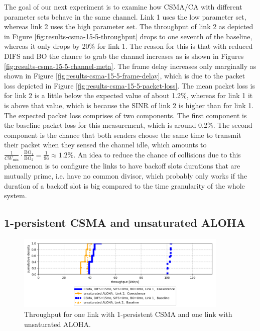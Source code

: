 The goal of our next experiment is to examine how CSMA/CA with different parameter sets behave in the same channel. Link 1 uses the low parameter set, whereas link 2 uses the high parameter set. The throughput of link 2 as depicted in Figure \ref{fig:results-csma-15-5-throughput} drops to one seventh of the baseline, whereas it only drops by 20\% for link 1. The reason for this is that with reduced DIFS and BO the chance to grab the channel increases as is shown in Figures \ref{fig:results-csma-15-5-channel-meta}. The frame delay increases only marginally as shown in Figure \ref{fig:results-csma-15-5-frame-delay}, which is due to the packet loss depicted in Figure \ref{fig:results-csma-15-5-packet-loss}. The mean packet loss is for link 2 is a little below the expected value of about 1.2\%, whereas for link 1 it is above that value, which is because the SINR of link 2 is higher than for link 1. The expected packet loss comprises of two components. The first component is the baseline packet loss for this measurement, which is around 0.2\%. The second component is the chance that both senders choose the same time to transmit their packet when they sensed the channel idle, which amounts to $ \frac{1}{CW_\text{min}} \cdot \frac{\text{BO}_1}{\text{BO}_2} = \frac{1}{96} \approx 1.2\% $. An idea to reduce the chance of collisions due to this phenomenon is to configure the links to have backoff slots durations that are mutually prime, i.e. have no common divisor, which probably only works if the duration of a backoff slot is big compared to the time granularity of the whole system. 

\clearpage

\subsection{1-persistent CSMA and unsaturated ALOHA}

\begin{figure}[tb]
	\label{fig:results-difs-only-aloha-throughput}
	\begin{center}
		\includegraphics[width=0.9\textwidth]{pictures/results/different_combinations/difs_only_aloha/throughput_cdf}
	\end{center}
	\caption{Throughput for one link with 1-persistent CSMA and one link with unsaturated ALOHA.}
\end{figure}

